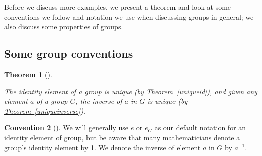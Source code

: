 \documentclass[10pt,]{book}
\theoremstyle{plain}
\newtheorem{theorem}{Theorem}[section]
\theoremstyle{definition}
\theoremstyle{definition}
\newtheorem{observation}[theorem]{Convention}
\theoremstyle{definition}
\theoremstyle{definition}
\numberwithin{equation}{section}
\begin{document}
      Before we discuss more examples, we present a theorem and look at some conventions we follow and notation we use when discussing groups in general; we also discuss some properties of groups.
\typeout{************************************************}
\typeout{************************************************}
\subsection[{Some group conventions}]{Some group conventions}\label{subsection-1}
\begin{theorem}[{}]\label{theorem-7}

          The identity element of a group is
          unique (by \hyperref[uniqueid]{Theorem~\ref{uniqueid}}), and given any element \(a\)
          of a group \(G\), the inverse of \(a\) in \(G\) is unique (by \hyperref[uniqueinverse]{Theorem~\ref{uniqueinverse}}).
\end{theorem}

\begin{observation}[]\label{observation-1}
We will generally use \(e\)
          or \(e_G\) as our default notation for an identity element of group, but be aware that many mathematicians denote a group's identity element by 1. We  denote the inverse of element \(a\) in \(G\) by \(a^{-1}\).%
\label{notation-36}
\label{notation-37}
\end{observation}
\end{document}
